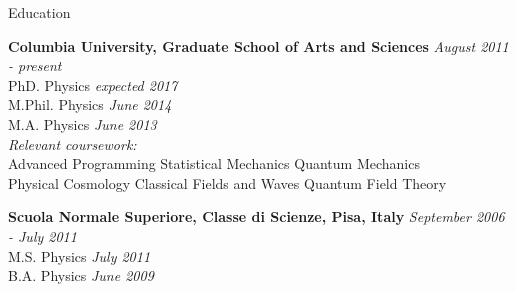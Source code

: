 \documentclass{resume} %
\begin{document}

\begin{rSection}{Education}

{\bf Columbia University, Graduate School of Arts and Sciences} \hfill {\em August 2011 - present} \\ 
PhD. Physics \hfill {\em expected 2017} \\
M.Phil. Physics \hfill {\em June 2014} \\ 
M.A. Physics \hfill {\em June 2013} 
\\
\textit{Relevant coursework:} \\
Advanced Programming \hspace{4pt} Statistical Mechanics \hspace{4pt} Quantum Mechanics\\
Physical Cosmology \hspace{4pt} Classical Fields and Waves \hspace{4pt} Quantum Field Theory

{\bf Scuola Normale Superiore, Classe di Scienze, Pisa, Italy} \hfill {\em September 2006 - July 2011} \\ 
M.S. Physics \hfill {\em July 2011} \\
B.A. Physics \hfill {\em June 2009} 

\end{rSection}

\end{document}
